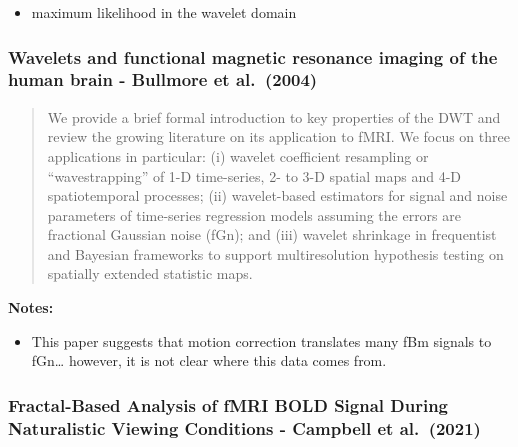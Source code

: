 \documentclass[
  sn-vancouver,
  Numbered,
  referee,
  lineno]{sn-jnl}
\providecommand{\tightlist}{%
  \setlength{\itemsep}{0pt}\setlength{\parskip}{0pt}}\usepackage{longtable,booktabs,array}
\begin{document}
\begin{itemize}
\tightlist
\item
  maximum likelihood in the wavelet domain
\end{itemize}

\subsubsection{\texorpdfstring{Wavelets and functional magnetic
resonance imaging of the human brain - Bullmore et al.~(2004)
\citep{bullmoreWaveletsFunctionalMagnetic2004}}{Wavelets and functional magnetic resonance imaging of the human brain - Bullmore et al.~(2004) {[}@bullmoreWaveletsFunctionalMagnetic2004{]}}}\label{wavelets-and-functional-magnetic-resonance-imaging-of-the-human-brain---bullmore-et-al.-2004-bullmorewaveletsfunctionalmagnetic2004}

\begin{quote}
We provide a brief formal introduction to key properties of the DWT and
review the growing literature on its application to fMRI. We focus on
three applications in particular: (i) wavelet coefficient resampling or
``wavestrapping'' of 1-D time-series, 2- to 3-D spatial maps and 4-D
spatiotemporal processes; (ii) wavelet-based estimators for signal and
noise parameters of time-series regression models assuming the errors
are fractional Gaussian noise (fGn); and (iii) wavelet shrinkage in
frequentist and Bayesian frameworks to support multiresolution
hypothesis testing on spatially extended statistic maps.
\end{quote}

\textbf{Notes:}

\begin{itemize}
\tightlist
\item
  This paper suggests that motion correction translates many fBm signals
  to fGn\ldots{} however, it is not clear where this data comes from.
\end{itemize}

\subsubsection{\texorpdfstring{Fractal-Based Analysis of fMRI BOLD
Signal During Naturalistic Viewing Conditions - Campbell et al.~(2021)
\citep{campbellFractalBasedAnalysisFMRI2022}}{Fractal-Based Analysis of fMRI BOLD Signal During Naturalistic Viewing Conditions - Campbell et al.~(2021) {[}@campbellFractalBasedAnalysisFMRI2022{]}}}\label{fractal-based-analysis-of-fmri-bold-signal-during-naturalistic-viewing-conditions---campbell-et-al.-2021-campbellfractalbasedanalysisfmri2022}
\end{document}
